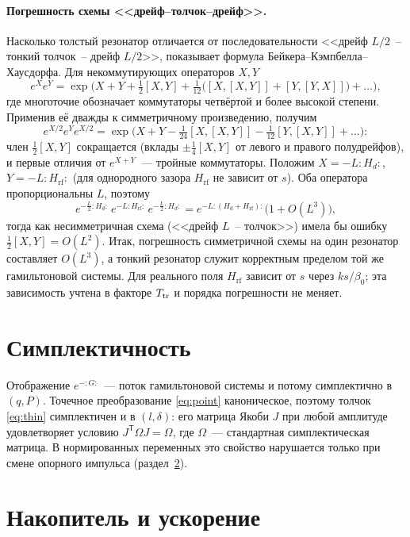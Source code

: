 \documentclass[a4paper,11pt]{article}
\numberwithin{equation}{section}
\newcommand{\rf}{\mathrm{rf}}
\begin{document}
\paragraph{Погрешность схемы <<дрейф--толчок--дрейф>>.}
Насколько толстый резонатор отличается от последовательности <<дрейф $L/2$~-- тонкий толчок~-- дрейф $L/2$>>,
показывает формула Бейкера--Кэмпбелла--Хаусдорфа. Для некоммутирующих операторов $X,Y$
\begin{equation}
e^{X}e^{Y}=\exp\!\Big(X+Y+\tfrac12[X,Y]+\tfrac1{12}\big([X,[X,Y]]+[Y,[Y,X]]\big)+\dots\Big),
\end{equation}
где многоточие обозначает коммутаторы четвёртой и более высокой степени. Применив её дважды к симметричному
произведению, получим
\begin{equation}
e^{X/2}e^{Y}e^{X/2}=\exp\!\Big(X+Y-\tfrac1{24}[X,[X,Y]]-\tfrac1{12}[Y,[X,Y]]+\dots\Big):
\end{equation}
член $\tfrac12[X,Y]$ сокращается (вклады $\pm\tfrac14[X,Y]$ от левого и правого полудрейфов), и первые отличия
от $e^{X+Y}$~--- тройные коммутаторы.
Положим $X=-L:H_d:$, $Y=-L:H_\rf:$ (для однородного зазора $H_\rf$ не зависит от $s$). Оба оператора
пропорциональны $L$, поэтому
\begin{equation}
e^{-\frac L2:H_d:}\,e^{-L:H_\rf:}\,e^{-\frac L2:H_d:}=e^{-L:(H_d+H_\rf):}\big(1+O(L^3)\big),
\end{equation}
тогда как несимметричная схема (<<дрейф $L$~-- толчок>>) имела бы ошибку $\tfrac12[X,Y]=O(L^2)$. Итак,
погрешность симметричной схемы на один резонатор составляет $O(L^3)$, а тонкий резонатор служит корректным
пределом той же гамильтоновой системы. Для реального поля $H_\rf$ зависит от $s$ через $ks/\beta_0$; эта
зависимость учтена в факторе $T_{\rm tr}$ и порядка погрешности не меняет.

\section{Симплектичность}
Отображение $e^{-:G:}$~--- поток гамильтоновой системы и потому симплектично в $(q,P)$. Точечное
преобразование \eqref{eq:point} каноническое, поэтому толчок \eqref{eq:thin} симплектичен и в $(l,\delta)$:
его матрица Якоби $J$ при любой амплитуде удовлетворяет условию $J^{\mathsf T}\Omega J=\Omega$, где $\Omega$~---
стандартная симплектическая матрица. В нормированных переменных это свойство нарушается только при смене
опорного импульса (раздел~\ref{sec:acc}).

\section{Накопитель и ускорение}
\label{sec:acc}
\end{document}

